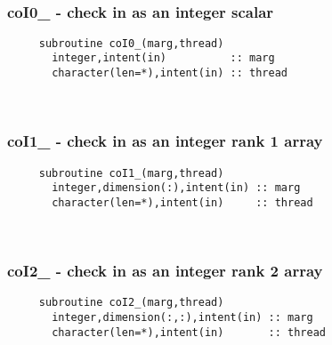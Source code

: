  
\mbox{}\hrulefill\ 
 
  \subsubsection{coI0\_ - check in as an integer scalar}

\begin{verbatim} 
     subroutine coI0_(marg,thread)
       integer,intent(in)          :: marg
       character(len=*),intent(in) :: thread
 \end{verbatim}%
 
 
\mbox{}\hrulefill\ 
 
  \subsubsection{coI1\_ - check in as an integer rank 1 array}

\begin{verbatim} 
     subroutine coI1_(marg,thread)
       integer,dimension(:),intent(in) :: marg
       character(len=*),intent(in)     :: thread
 \end{verbatim}%
 
 
\mbox{}\hrulefill\ 
 
  \subsubsection{coI2\_ - check in as an integer rank 2 array}

\begin{verbatim} 
     subroutine coI2_(marg,thread)
       integer,dimension(:,:),intent(in) :: marg
       character(len=*),intent(in)       :: thread
 \end{verbatim}%
 
